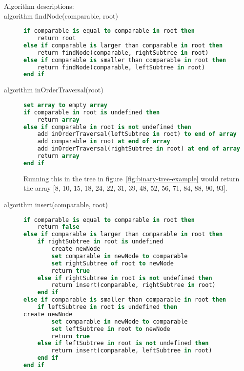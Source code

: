 \documentclass {article}
\begin{document}
\begin{description}
\item[Algorithm descriptions:]
\item [algorithm findNode(comparable, root)]
\item[]
\begin{lstlisting}[language=Pascal]
if comparable is equal to comparable in root then
 	return root
else if comparable is larger than comparable in root then
 	return findNode(comparable, rightSubtree in root)
else if comparable is smaller than comparable in root then
 	return findNode(comparable, leftSubtree in root)
end if
\end{lstlisting}

\item [algorithm inOrderTraversal(root)]
\item []
\begin{lstlisting}[language=Pascal]
set array to empty array
if comparable in root is undefined then
 	return array
else if comparable in root is not undefined then
 	add inOrderTraversal(leftSubtree in root) to end of array
 	add comparable in root at end of array
 	add inOrderTraversal(rightSubtree in root) at end of array
 	return array
end if
\end{lstlisting}

\item[] Running this in the tree in figure~\ref{fig:binary-tree-example} would return the array [8, 10, 15, 18, 24, 22, 31, 39, 48, 52, 56, 71, 84, 88, 90, 93].

\item [algorithm insert(comparable, root)]
\item []
\begin{lstlisting}[language=Pascal]
if comparable is equal to comparable in root then
  	return false
else if comparable is larger than comparable in root then
	if rightSubtree in root is undefined
		create newNode
		set comparable in newNode to comparable
		set rightSubtree of root to newNode
		return true
	else if rightSubtree in root is not undefined then
  		return insert(comparable, rightSubtree in root)
 	end if
else if comparable is smaller than comparable in root then 
 	if leftSubtree in root is undefined then 
create newNode
 		set comparable in newNode to comparable
 		set leftSubtree in root to newNode
 		return true
 	else if leftSubtree in root is not undefined then
 		return insert(comparable, leftSubtree in root)
 	end if
end if
\end{lstlisting}
\end{description}
\end{document}
